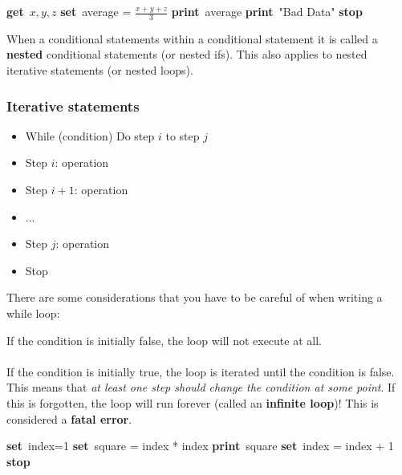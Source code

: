 \documentclass[]{article}
\newcommand{\Get}{\State \textbf{get}~}
\newcommand{\Set}{\State \textbf{set}~}
\newcommand{\Print}{\State \textbf{print}~}
\newcommand{\Stop}{\State \textbf{stop}~}
\begin{document}
\begin{algorithm}
	\caption{\\Print average of three number if the first number is larger than 0, otherwise print an error message.}
	\begin{algorithmic}[1]
		\Get $x, y, z$
			\Set average = $\frac{x + y + z}{3}$
			\Print average
		\Else	
			\Print "Bad Data"
		\EndIf
		\Stop
	\end{algorithmic}
\end{algorithm}

\noindent When a conditional statements within a conditional statement it is called a \textbf{nested} conditional statements (or nested ifs). This also applies to nested iterative statements (or nested loops).


\subsubsection{Iterative statements}
\bigbreak
\begin{itemize}
	\item While (condition) Do step $i$ to step $j$ \setlength{\itemindent}{0.5cm}
		\item Step $i$: operation
		\item Step $i + 1$: operation
		\item ...
		\item Step $j$: operation
	\setlength{\itemindent}{0cm}\item Stop\smallskip
\end{itemize}

\noindent There are some considerations that you have to be careful of when writing a while loop:\\
\begin{addmargin}[2em]{0em}
	If the condition is initially false, the loop will not execute at all.\\\\
	If the condition is initially true, the loop is iterated until the condition is false. This means that \textit{at least one step should change the condition at some point}. If this is forgotten, the loop will run forever (called an \textbf{infinite loop})! This is considered a \textbf{fatal error}.\\
\end{addmargin}


\begin{algorithm}
	\caption{\\Compute and print the square of the first 100 integers.}
	\begin{algorithmic}[1]
		\Set index=1
			\Set square = index * index
			\Print square
			\Set index = index + 1
		\EndWhile
		\Stop
	\end{algorithmic}
\end{algorithm}
\end{document}
